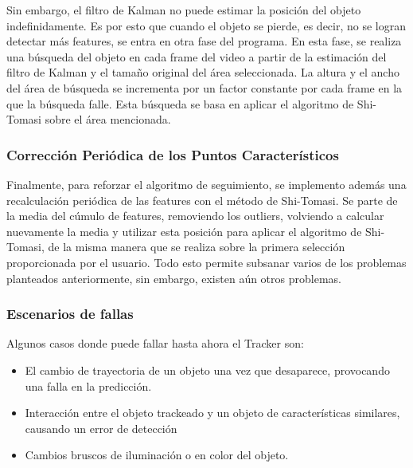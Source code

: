 Sin embargo, el filtro de Kalman no puede estimar la posición del objeto indefinidamente. Es por esto que cuando el objeto se pierde, es decir, no se logran detectar más features, se entra en otra fase del programa. En esta fase, se realiza una búsqueda del objeto en cada frame del video a partir de la estimación del filtro de Kalman y el tamaño original del área seleccionada. La altura y el ancho del área de búsqueda se incrementa por un factor constante por cada frame en la que la búsqueda falle. Esta búsqueda se basa en aplicar el algoritmo de Shi-Tomasi sobre el área mencionada.

\subsubsection{Corrección Periódica de los Puntos Característicos}

Finalmente, para reforzar el algoritmo de seguimiento, se implemento además una recalculación periódica de las features con el método de Shi-Tomasi. Se parte de la media del cúmulo de features, removiendo los outliers, volviendo a calcular nuevamente la media y utilizar esta posición para aplicar el algoritmo de Shi-Tomasi, de la misma manera que se realiza sobre la primera selección proporcionada por el usuario. Todo esto permite subsanar varios de los problemas planteados anteriormente, sin embargo, existen aún otros problemas.

\subsubsection{Escenarios de fallas}
Algunos casos donde puede fallar hasta ahora el Tracker son:
\begin{itemize}
\item El cambio de trayectoria de un objeto una vez que desaparece, provocando una falla en la predicción.
\item Interacción entre el objeto trackeado y un objeto de características similares, causando un error de detección
\item Cambios bruscos de iluminación o en color del objeto.
\end{itemize}































